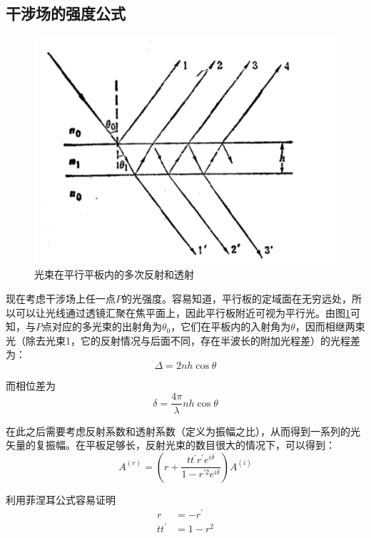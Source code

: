 \documentclass[UTF8]{ctexart}
\begin{document}
	\subsection{干涉场的强度公式}
	\begin{figure}[ht]
		\centering
		\includegraphics[width=12cm]{Interference_lights.png}
		\caption{光束在平行平板内的多次反射和透射}
		\label{figure_lights}
	\end{figure}

	现在考虑干涉场上任一点$ P $的光强度。容易知道，平行板的定域面在无穷远处，所以可以让光线通过透镜汇聚在焦平面上，因此平行板附近可视为平行光。由图\ref{figure_lights}可知，与$ P $点对应的多光束的出射角为$ \theta_{0} $，它们在平板内的入射角为$ \theta $，因而相继两束光（除去光束1，它的反射情况与后面不同，存在半波长的附加光程差）的光程差为：
	\begin{equation}
	\Delta=2 n h \cos \theta
	\end{equation}
	
\noindent 而相位差为
\begin{equation}
\delta=\frac{4 \pi}{\lambda} n h \cos \theta
\end{equation}

	在此之后需要考虑反射系数和透射系数（定义为振幅之比），从而得到一系列的光矢量的复振幅。在平板足够长，反射光束的数目很大的情况下，可以得到：
	\begin{equation}
	A^{(r)}=\left(r+\frac{t t^{\prime} r^{\prime} e^{i \delta}}{1-r^{\prime 2} e^{i \delta}}\right) A^{(i)}
	\end{equation}
	
\noindent 利用菲涅耳公式容易证明
\begin{equation}
	\begin{aligned}
		r&=-r^{\prime}\\
		t t^{\prime}&=1-r^{2}
	\end{aligned}
\end{equation}
\end{document}
